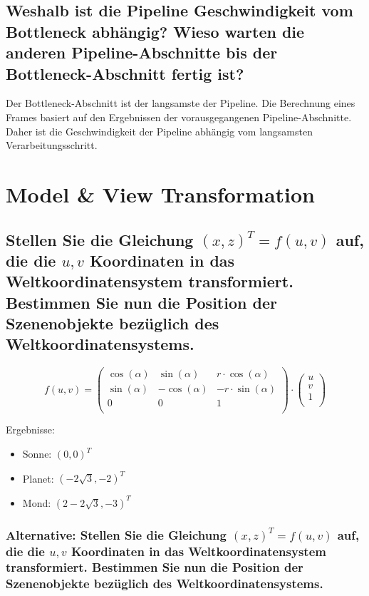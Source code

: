 \documentclass[a4paper,10pt,DIV=14]{scrartcl}
\begin{document}
\subsection{Weshalb ist die Pipeline Geschwindigkeit vom Bottleneck abhängig? Wieso warten die anderen Pipeline-Abschnitte bis der Bottleneck-Abschnitt fertig ist?}
Der Bottleneck-Abschnitt ist der langsamste der Pipeline. Die Berechnung eines Frames basiert auf den Ergebnissen der vorausgegangenen Pipeline-Abschnitte. Daher ist die Geschwindigkeit der Pipeline abhängig vom langsamsten Verarbeitungsschritt.


\section{Model \& View Transformation}

\subsection{Stellen Sie die Gleichung $(x, z)^T = f(u,v)$ auf, die die $u, v$ Koordinaten in das Weltkoordinatensystem transformiert. Bestimmen Sie nun die Position der Szenenobjekte bezüglich des Weltkoordinatensystems.}

$$f(u,v) = \begin{pmatrix}
\cos(\alpha) & \sin(\alpha)  & r \cdot \cos(\alpha)  \\
\sin(\alpha) & -\cos(\alpha) & -r \cdot \sin(\alpha) \\
0            & 0             & 1                     \\
\end{pmatrix} \cdot \begin{pmatrix} u \\ v \\ 1 \\ \end{pmatrix} $$

Ergebnisse:
\begin{itemize}[itemsep=0pt]
	\item Sonne: $ (0, 0)^T $
	\item Planet: $ (-2\sqrt{3}, -2)^T $
	\item Mond: $ (2 - 2\sqrt{3}, -3)^T $
\end{itemize}

\subsubsection{Alternative: Stellen Sie die Gleichung $(x, z)^T = f(u,v)$ auf, die die $u, v$ Koordinaten in das Weltkoordinatensystem transformiert. Bestimmen Sie nun die Position der Szenenobjekte bezüglich des Weltkoordinatensystems.}
\end{document}
